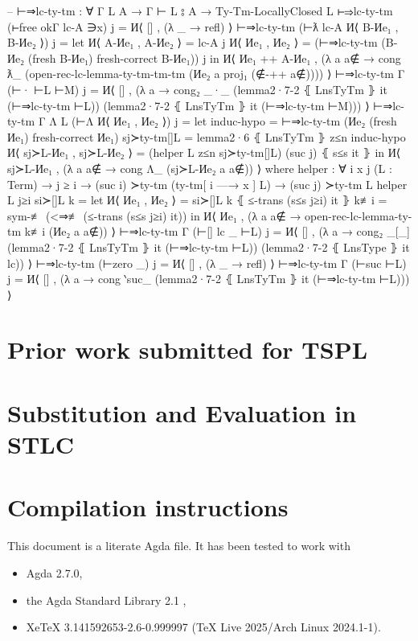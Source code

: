 \documentclass[logo,bsc,singlespacing,parskip,online]{infthesis}
\begin{document}
\begin{code}
  -- ⊢⇒lc-ty-tm : ∀ {Γ L A} → Γ ⊢ L ⦂ A → Ty-Tm-LocallyClosed L
  ⊢⇒lc-ty-tm (⊢free okΓ lc-A ∋x) j = И⟨ [] , (λ _ → refl) ⟩
  ⊢⇒lc-ty-tm (⊢ƛ lc-A И⟨ B-Иe₁ , B-Иe₂ ⟩) j =
    let И⟨ A-Иe₁ , A-Иe₂ ⟩ = lc-A j
        И⟨ Иe₁ , Иe₂ ⟩ = (⊢⇒lc-ty-tm (B-Иe₂ (fresh B-Иe₁) {fresh-correct B-Иe₁})) j
    in И⟨ Иe₁ ++ A-Иe₁ , (λ a {a∉} → cong ƛ_
      (open-rec-lc-lemma-ty-tm-tm-tm (Иe₂ a {proj₁ (∉-++ a∉)}))) ⟩
  ⊢⇒lc-ty-tm {Γ} (⊢· ⊢L ⊢M) j = И⟨ [] , (λ a → cong₂ _·_
    (lemma2·7-2 ⦃ LnsTyTm ⦄ it (⊢⇒lc-ty-tm ⊢L))
    (lemma2·7-2 ⦃ LnsTyTm ⦄ it (⊢⇒lc-ty-tm ⊢M))) ⟩
  ⊢⇒lc-ty-tm {Γ} {Λ L} (⊢Λ И⟨ Иe₁ , Иe₂ ⟩) j =
      let induc-hypo = ⊢⇒lc-ty-tm (Иe₂ (fresh Иe₁) {fresh-correct Иe₁})
          sj≻ty-tm[]L = lemma2·6 ⦃ LnsTyTm ⦄ z≤n induc-hypo
          И⟨ sj≻L-Иe₁ , sj≻L-Иe₂ ⟩ = (helper L z≤n sj≻ty-tm[]L) (suc j) ⦃ s≤s it ⦄
      in И⟨ sj≻L-Иe₁ , (λ a {a∉} → cong Λ_ (sj≻L-Иe₂ a {a∉})) ⟩
    where
      helper : ∀ {i x j} (L : Term) → j ≥ i → (suc i) ≻ty-tm (ty-tm[ i —→ x ] L) → (suc j) ≻ty-tm L
      helper L j≥i si≻[]L k =
        let И⟨ Иe₁ , Иe₂ ⟩ = si≻[]L k ⦃ ≤-trans (s≤s j≥i) it ⦄
            k≢i = sym-≢ (<⇒≢ (≤-trans (s≤s j≥i) it))
        in И⟨ Иe₁ , (λ a {a∉} → open-rec-lc-lemma-ty-tm k≢i (Иe₂ a {a∉})) ⟩
  ⊢⇒lc-ty-tm {Γ} (⊢[] lc _ ⊢L) j = И⟨ [] , (λ a → cong₂ _[_]
    (lemma2·7-2 ⦃ LnsTyTm ⦄ it (⊢⇒lc-ty-tm ⊢L))
    (lemma2·7-2 ⦃ LnsType ⦄ it lc)) ⟩
  ⊢⇒lc-ty-tm (⊢zero _) j = И⟨ [] , (λ _ → refl) ⟩
  ⊢⇒lc-ty-tm {Γ} (⊢suc ⊢L) j = И⟨ [] , (λ a →
    cong ‵suc_ (lemma2·7-2 ⦃ LnsTyTm ⦄ it (⊢⇒lc-ty-tm ⊢L))) ⟩
\end{code}

\chapter{Prior work submitted for TSPL}
\label{appendix:tspl}


\chapter{Substitution and Evaluation in STLC}
\label{appendix:stlc_sub_and_eval}


\chapter{Compilation instructions}
\label{appendix:compilation_instructions}

This document is a literate Agda file. It has been tested to work with
\begin{itemize}
  \item Agda 2.7.0,
  \item the Agda Standard Library 2.1 \citep{the_agda_community_agda_2024},
  \item XeTeX 3.141592653-2.6-0.999997 (TeX Live 2025/Arch Linux 2024.1-1).
\end{itemize}
\end{document}
